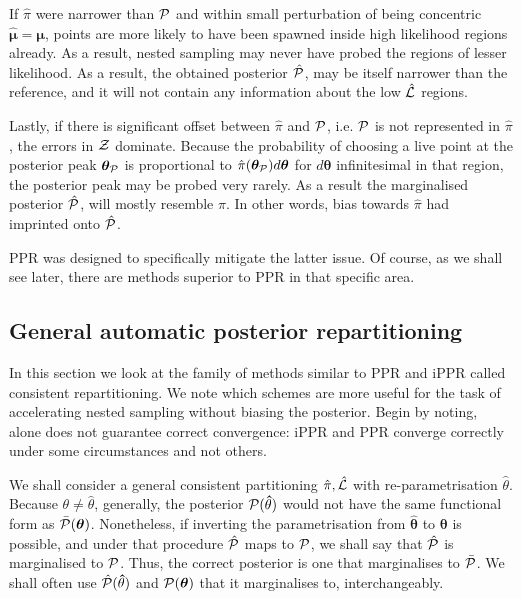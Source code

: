 \documentclass[usenatbib]{mnras}
\begin{document}
If $\hat{\pi}$ were narrower than ${\cal P}$ and within small
perturbation of being concentric \(\hat{\bm{\mu}} = \bm{\mu}\), points
are more likely to have been spawned inside high likelihood regions
already. As a result, nested sampling may never have probed the
regions of lesser likelihood. As a result, the obtained posterior
$\hat{\cal P}$, may be itself narrower than the reference, and it will
not contain any information about the low $\hat{\cal L}$ regions.

Lastly, if there is significant offset between $\hat{\pi}$ and
${\cal P}$, i.e. ${\cal P}$ is not represented in $\hat{\pi}$, the
errors in ${\cal Z}$ dominate. Because the probability of choosing a
live point at the posterior peak \(\bm{\theta}_{{\cal P}}\) is
proportional to $\hat{\pi}(\bm{\theta}_{{\cal P}})d\bm{\theta}$ for
\(d\bm{\theta}\) infinitesimal in that region, the posterior peak may
be probed very rarely. As a result the marginalised posterior
$\hat{\cal P}$, will mostly resemble $\hat{\pi}$. In other words, bias
towards $\hat{\pi}$ had imprinted onto $\hat{\cal P}$.

PPR was designed to specifically mitigate the latter issue. Of course,
as we shall see later, there are methods superior to PPR in that
specific area.
\subsection{General automatic posterior repartitioning}

In this section we look at the family of methods similar to PPR and
iPPR called consistent repartitioning. We note which schemes are more
useful for the task of accelerating nested sampling without biasing
the posterior. Begin by noting,  alone does not
guarantee correct convergence: iPPR and PPR converge correctly under
some circumstances and not others.

We shall consider a general consistent partitioning
\(\hat{\pi}, \hat{\cal L}\) with re-parametrisation
\(\hat{\theta}\). Because $\theta \ne \hat{\theta}$, generally, the
posterior \({\cal P}(\bm\hat{\theta})\) would not have the same
functional form as \(\bar{\cal P}(\bm{\theta})\). Nonetheless, if
inverting the parametrisation from $\bm{\hat{\theta}}$ to $\bm{\theta}$
is possible, and under that procedure $\hat{\cal P}$ maps to
${\cal P}$, we shall say that $\hat{\cal P}$ is marginalised to
${\cal P}$. Thus, the correct posterior is one that marginalises to
$\bar{\cal P}$. We shall often use $\hat{\cal P}(\bm\hat{\theta})$ and
${\cal P}(\bm{\theta})$ that it marginalises to, interchangeably.
\end{document}
